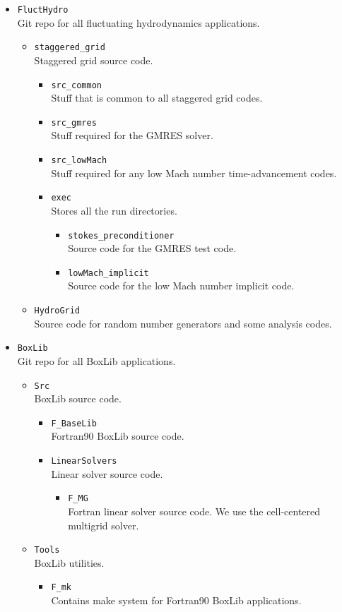 \documentclass[final]{siamltex}
\begin{document}
\begin{itemize}
\item {\tt FluctHydro}\\
Git repo for all fluctuating hydrodynamics applications.
\begin{itemize}
\item {\tt staggered\_grid}\\
Staggered grid source code.
\begin{itemize}
\item {\tt src\_common}\\
Stuff that is common to all staggered grid codes.
\item {\tt src\_gmres}\\
Stuff required for the GMRES solver.
\item {\tt src\_lowMach}\\
Stuff required for any low Mach number time-advancement codes.
\item {\tt exec}\\
Stores all the run directories.
\begin{itemize}
\item {\tt stokes\_preconditioner}\\
Source code for the GMRES test code.
\item {\tt lowMach\_implicit}\\
Source code for the low Mach number implicit code.
\end{itemize}
\end{itemize}
\item {\tt HydroGrid}\\
Source code for random number generators and some analysis codes.
\end{itemize}
\item {\tt BoxLib}\\
Git repo for all BoxLib applications.
\begin{itemize}
\item {\tt Src}\\
BoxLib source code.
\begin{itemize}
\item {\tt F\_BaseLib}\\
Fortran90 BoxLib source code.
\item {\tt LinearSolvers}\\
Linear solver source code.
\begin{itemize}
\item {\tt F\_MG}\\
Fortran linear solver source code.  We use the cell-centered multigrid solver.
\end{itemize}
\end{itemize}
\item {\tt Tools}\\
BoxLib utilities.
\begin{itemize}
\item {\tt F\_mk}\\
Contains make system for Fortran90 BoxLib applications.
\end{itemize}
\end{itemize}
\end{itemize}
\end{document}
